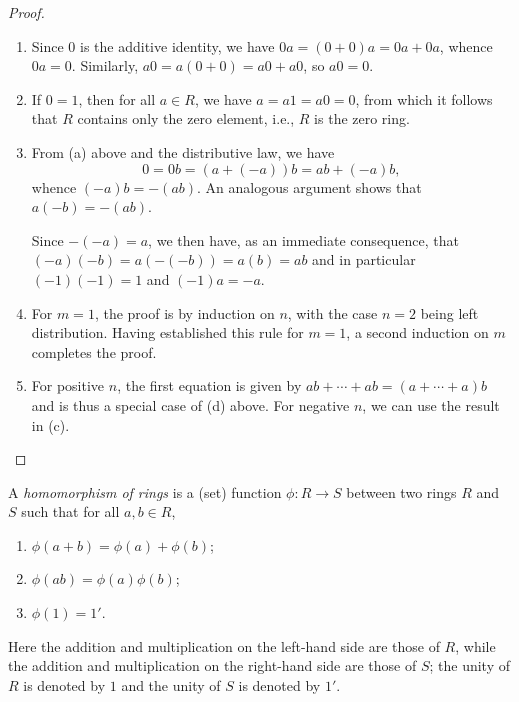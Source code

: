 \begin{proof}\(\)
    \begin{enumerate}[label=(\alph*), wide]
        \item Since \(0\) is the additive identity, we have \(0a = (0 + 0)a = 0a
        + 0a\), whence \(0a = 0\). Similarly, \(a0 = a(0 + 0) = a0 + a0\), so
        \(a0 = 0\).

        \item If \(0 = 1\), then for all \(a \in R\), we have \(a = a1 = a0 = 0\), from which it follows that \(R\) contains only the zero element, i.e., \(R\) is the zero ring.
        
        \item From (a) above and the distributive law, we have
        \[
            0 = 0b = (a + (-a))b = ab + (-a)b,
        \]
        whence \((-a)b = -(ab)\). An analogous argument shows that \(a(-b) = -(ab)\).

        Since \(-(-a) = a\), we then have, as an immediate consequence, that \((-a)(-b) = a(-(-b)) = a(b) = ab\) and in particular \((-1)(-1) = 1\) and \((-1)a = -a\).

        \item For \(m = 1\), the proof is by induction on \(n\), with the case \(n = 2\) being left distribution. Having established this rule for \(m = 1\), a second induction on \(m\) completes the proof.
        
        \item For positive \(n\), the first equation is given by \(ab + \cdots + ab = (a + \cdots + a)b\) and is thus a special case of (d) above. For negative \(n\), we can use the result in (c).
    \end{enumerate}
\end{proof}


\begin{definition}
    \label{def:ring-homomorphism}
    A \emph{homomorphism of rings} is a (set) function \(\phi: R \to S\) between
    two rings \(R\) and \(S\) such that for all \(a, b \in R\),
    \begin{enumerate}[label=(\alph*)]
        \item \(\phi(a + b) = \phi(a) + \phi(b)\);
        \item \(\phi(ab) = \phi(a)\phi(b)\);
        \item \(\phi(1) = 1'\).
    \end{enumerate}
    Here the addition and multiplication on the left-hand side are those of
    \(R\), while the addition and multiplication on the right-hand side are
    those of \(S\); the unity of \(R\) is denoted by \(1\) and the unity of
    \(S\) is denoted by \(1'\).
\end{definition}

